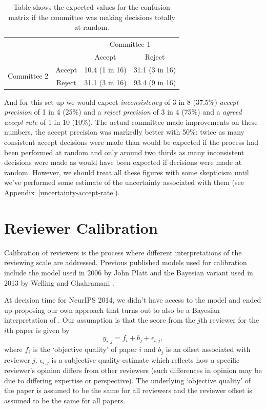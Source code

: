 \begin{table}[htb]
\caption{Table shows the expected values for the confusion matrix if the committee was making decisions totally at random.}
\label{table-random-committee}
\centering


  \begin{tabular}{lc|c|c|}
  & & \multicolumn{2}{c}{Committee 1} \\
  & & Accept & Reject \\ \hline
  \multirow{2}{*}{Committee 2} & Accept & 10.4 (1 in 16) & 31.1 (3 in 16) \\ 
  & Reject & 31.1 (3 in 16) & 93.4 (9 in 16)
  \end{tabular}
\end{table}

And for this set up we would expect \emph{inconsistency} of 3 in 8
(37.5\%) \emph{accept precision} of 1 in 4 (25\%) and a \emph{reject
precision} of 3 in 4 (75\%) and a \emph{agreed accept rate} of 1 in 10
(10\%). The actual committee made improvements on these numbers, the
accept precision was markedly better with 50\%: twice as many consistent
accept decisions were made than would be expected if the process had
been performed at random and only around two thirds as many inconsistent
decisions were made as would have been expected if decisions were made
at random. However, we should treat all these figures with some
skepticism until we've performed some estimate of the uncertainty
associated with them (see Appendix~\ref{uncertainty-accept-rate}).



\section{Reviewer Calibration}
\label{app:reviewer-calibration}

Calibration of reviewers is the process where different interpretations
of the reviewing scale are addressed. Previous published models used for calibration include the model used in 2006 by John Platt \citep{Platt-calibration12} and the Bayesian variant used in 2013 by Welling and Ghahramani \cite{Ge-bayesian15}.

At decision time for NeurIPS 2014, we didn't have access to the \cite{Ge-bayesian15} model and ended up proposing our own approach that turns out to also be a Bayesian interpretation of \cite{Platt-calibration12}. Our assumption is
that the score from the \(j\)th reviewer for the \(i\)th paper is given
by \[
y_{i,j} = f_i + b_j + \epsilon_{i, j},
\] 
where \(f_i\) is the `objective quality' of paper \(i\) and \(b_j\)
is an offset associated with reviewer \(j\). \(\epsilon_{i,j}\) is a
subjective quality estimate which reflects how a specific reviewer's
opinion differs from other reviewers (such differences in opinion may be
due to differing expertise or perspective). The underlying `objective
quality' of the paper is assumed to be the same for all reviewers and
the reviewer offset is assumed to be the same for all papers.

